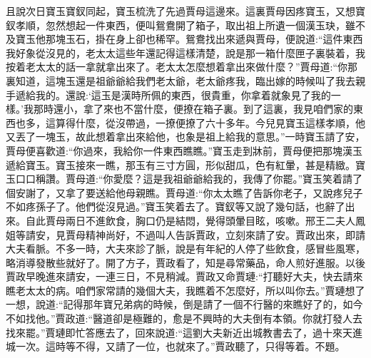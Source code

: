 \begin{parag}
    且說次日寶玉寶釵同起，寶玉梳洗了先過賈母這邊來。這裏賈母因疼寶玉，又想寶釵孝順，忽然想起一件東西，便叫鴛鴦開了箱子，取出祖上所遺一個漢玉玦，雖不及寶玉他那塊玉石，掛在身上卻也稀罕。鴛鴦找出來遞與賈母，便說道:“這件東西我好象從沒見的，老太太這些年還記得這樣清楚，說是那一箱什麼匣子裏裝着，我按着老太太的話一拿就拿出來了。老太太怎麼想着拿出來做什麼？”賈母道:“你那裏知道，這塊玉還是祖爺爺給我們老太爺，老太爺疼我，臨出嫁的時候叫了我去親手遞給我的。還說:‘這玉是漢時所佩的東西，很貴重，你拿着就象見了我的一樣。’我那時還小，拿了來也不當什麼，便撩在箱子裏。到了這裏，我見咱們家的東西也多，這算得什麼，從沒帶過，一撩便撩了六十多年。今兒見寶玉這樣孝順，他又丟了一塊玉，故此想着拿出來給他，也象是祖上給我的意思。”一時寶玉請了安，賈母便喜歡道:“你過來，我給你一件東西瞧瞧。”寶玉走到牀前，賈母便把那塊漢玉遞給寶玉。寶玉接來一瞧，那玉有三寸方圓，形似甜瓜，色有紅暈，甚是精緻。寶玉口口稱讚。賈母道:“你愛麼？這是我祖爺爺給我的，我傳了你罷。”寶玉笑着請了個安謝了，又拿了要送給他母親瞧。賈母道:“你太太瞧了告訴你老子，又說疼兒子不如疼孫子了。他們從沒見過。”寶玉笑着去了。寶釵等又說了幾句話，也辭了出來。自此賈母兩日不進飲食，胸口仍是結悶，覺得頭暈目眩，咳嗽。邢王二夫人鳳姐等請安，見賈母精神尚好，不過叫人告訴賈政，立刻來請了安。賈政出來，即請大夫看脈。不多一時，大夫來診了脈，說是有年紀的人停了些飲食，感冒些風寒，略消導發散些就好了。開了方子，賈政看了，知是尋常藥品，命人煎好進服。以後賈政早晚進來請安，一連三日，不見稍減。賈政又命賈璉:“打聽好大夫，快去請來瞧老太太的病。咱們家常請的幾個大夫，我瞧着不怎麼好，所以叫你去。”賈璉想了一想，說道:“記得那年寶兄弟病的時候，倒是請了一個不行醫的來瞧好了的，如今不如找他。”賈政道:“醫道卻是極難的，愈是不興時的大夫倒有本領。你就打發人去找來罷。”賈璉即忙答應去了，回來說道:“這劉大夫新近出城教書去了，過十來天進城一次。這時等不得，又請了一位，也就來了。”賈政聽了，只得等着。不題。
\end{parag}


